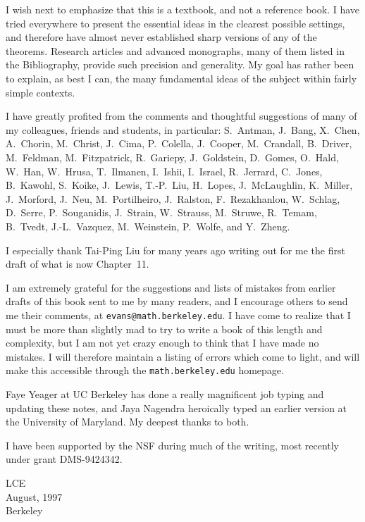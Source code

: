 I wish next to emphasize that this is a textbook, and not a reference book.
I have tried everywhere to present the essential ideas in the clearest possible
settings, and therefore have almost never established sharp versions of any
of the theorems. Research articles and advanced monographs, many of them
listed in the Bibliography, provide such precision and generality. My goal
has rather been to explain, as best I can, the many fundamental ideas of the
subject within fairly simple contexts.

I have greatly profited from the comments and thoughtful suggestions of many
of my colleagues, friends and students, in particular: S.~Antman, J.~Bang,
X.~Chen, A.~Chorin, M.~Christ, J.~Cima, P.~Colella, J.~Cooper, M.~Crandall,
B.~Driver, M.~Feldman, M.~Fitzpatrick, R.~Gariepy, J.~Goldstein, D.~Gomes,
O.~Hald, W.~Han, W.~Hrusa, T.~Ilmanen, I.~Ishii, I.~Israel, R.~Jerrard,
C.~Jones, B.~Kawohl, S.~Koike, J.~Lewis, T.-P.~Liu, H.~Lopes, J.~McLaughlin,
K.~Miller, J.~Morford, J.~Neu, M.~Portilheiro, J.~Ralston, F.~Rezakhanlou,
W.~Schlag, D.~Serre, P.~Souganidis, J.~Strain, W.~Strauss, M.~Struwe,
R.~Temam, B.~Tvedt, J.-L.~Vazquez, M.~Weinstein, P.~Wolfe, and Y.~Zheng.

I especially thank Tai-Ping Liu for many years ago writing out for me the
first draft of what is now Chapter~11.

I am extremely grateful for the suggestions and lists of mistakes from earlier
drafts of this book sent to me by many readers, and I encourage others to send
me their comments, at \nolinkurl{evans@math.berkeley.edu}. I have come to realize
that I must be more than slightly mad to try to write a book of this length
and complexity, but I am not yet crazy enough to think that I have made no
mistakes. I will therefore maintain a listing of errors which come to light,
and will make this accessible through the \texttt{math.berkeley.edu} homepage.

Faye Yeager at UC Berkeley has done a really magnificent job typing and
updating these notes, and Jaya Nagendra heroically typed an earlier version at
the University of Maryland. My deepest thanks to both.

I have been supported by the NSF during much of the writing, most recently
under grant DMS-9424342.

\begin{flushright}
LCE\\
August, 1997\\
Berkeley
\end{flushright}
